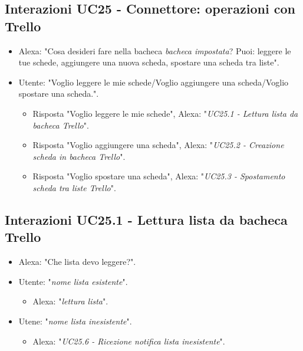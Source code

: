 \subsection{Interazioni  UC25 - Connettore: operazioni con Trello}
\label{sec:connettore_trello} 
 \begin{itemize}
        \item Alexa: "Cosa desideri fare nella bacheca {\it bacheca impostata}? Puoi: leggere le tue schede, aggiungere una nuova scheda, spostare una scheda tra liste".
        \item Utente: "Voglio leggere le mie schede/Voglio aggiungere una scheda/Voglio spostare una scheda.".
        \begin{itemize}
         \item{Risposta "Voglio leggere le mie schede"}, Alexa: "{\it UC25.1 - Lettura lista da bacheca Trello}".
         \item{Risposta "Voglio aggiungere una scheda"}, Alexa: "{\it  UC25.2 - Creazione scheda in bacheca Trello}".
         \item{Risposta "Voglio spostare una scheda"}, Alexa: "{\it UC25.3 - Spostamento scheda tra liste Trello}".
         \end{itemize}
    \end{itemize}


\subsection{Interazioni UC25.1 - Lettura lista da bacheca Trello}
\label{sec:connettore_trello_leggi_bacheca}
 \begin{itemize}
        \item Alexa: "Che lista devo leggere?".
        \item Utente: "{\it nome lista esistente}".
        \begin{itemize}
        \item Alexa: "{\it lettura lista}".
           \end{itemize}
        \item Utene: "{\it nome lista inesistente}".
           \begin{itemize}
        \item Alexa: "{\it UC25.6 - Ricezione notifica lista inesistente}".
           \end{itemize}
    \end{itemize}


